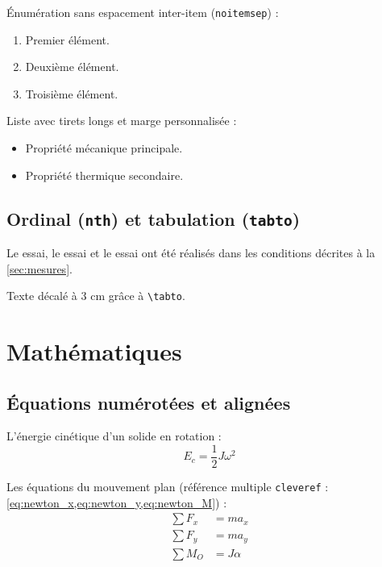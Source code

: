 \documentclass{poly}
\begin{document}
Énumération sans espacement inter-item (\texttt{noitemsep}) :
\begin{enumerate}[label=\arabic*., leftmargin=*, noitemsep]
    \item Premier élément.
    \item Deuxième élément.
    \item Troisième élément.
\end{enumerate}

Liste avec tirets longs et marge personnalisée :
\begin{itemize}[label=\textemdash, leftmargin=2em, itemsep=2pt]
    \item Propriété mécanique principale.
    \item Propriété thermique secondaire.
\end{itemize}

\subsection{Ordinal (\texttt{nth}) et tabulation (\texttt{tabto})}

Le  essai, le  essai et le  essai ont été réalisés
dans les conditions décrites à la \cref{sec:mesures}.

\tabto{3cm}Texte décalé à 3 cm grâce à \texttt{\textbackslash tabto}.

\section{Mathématiques}\label{sec:maths}

\subsection{Équations numérotées et alignées}

L'énergie cinétique d'un solide en rotation :
\begin{equation}
    E_c = \frac{1}{2} J \omega^2
    \label{eq:ecinrot}
\end{equation}

Les équations du mouvement plan (référence multiple
\texttt{cleveref} : \cref{eq:newton_x,eq:newton_y,eq:newton_M}) :
\begin{align}
    \sum F_x &= m a_x  \label{eq:newton_x}\\
    \sum F_y &= m a_y  \label{eq:newton_y}\\
    \sum M_O &= J\alpha \label{eq:newton_M}
\end{align}
\end{document}
